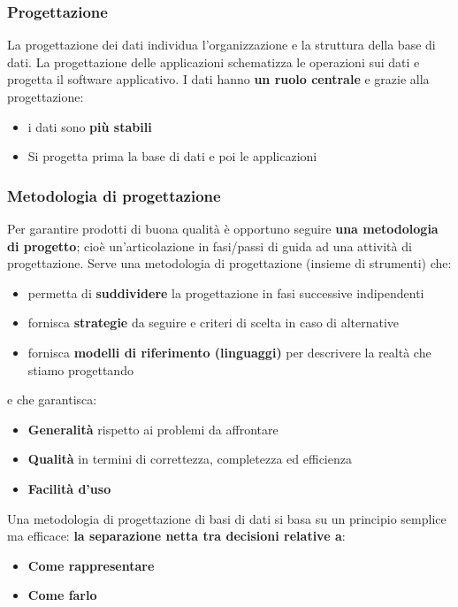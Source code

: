 \documentclass[12pt]{article}
\begin{document}
\subsubsection{Progettazione}
La progettazione dei dati individua l'organizzazione e la struttura della base di dati.
La progettazione delle applicazioni schematizza le operazioni sui dati e progetta il software applicativo.
I dati hanno \textbf{un ruolo centrale} e grazie alla progettazione:
\begin{itemize}
    \item i dati sono \textbf{più stabili}
    \item Si progetta prima la base di dati e poi le applicazioni
\end{itemize}
\subsubsection{Metodologia di progettazione}
Per garantire prodotti di buona qualità è opportuno seguire \textbf{una metodologia di progetto}; cioè un'articolazione in fasi/passi di guida ad una attività di progettazione.
Serve una metodologia di progettazione (insieme di strumenti) che:
\begin{itemize}
    \item permetta di \textbf{suddividere} la progettazione in fasi successive indipendenti
    \item fornisca \textbf{strategie} da seguire e criteri di scelta in caso di alternative
    \item fornisca \textbf{modelli di riferimento (linguaggi)} per descrivere la realtà che stiamo progettando
\end{itemize}
e che garantisca:
\begin{itemize}
    \item \textbf{Generalità} rispetto ai problemi da affrontare
    \item \textbf{Qualità} in termini di correttezza, completezza ed efficienza
    \item \textbf{Facilità d'uso}
\end{itemize}
Una metodologia di progettazione di basi di dati si basa su un principio semplice ma efficace:
\textbf{la separazione netta tra decisioni relative a}:
\begin{itemize}
    \item \textbf{Come rappresentare}
    \item \textbf{Come farlo}
\end{itemize}
\end{document}
